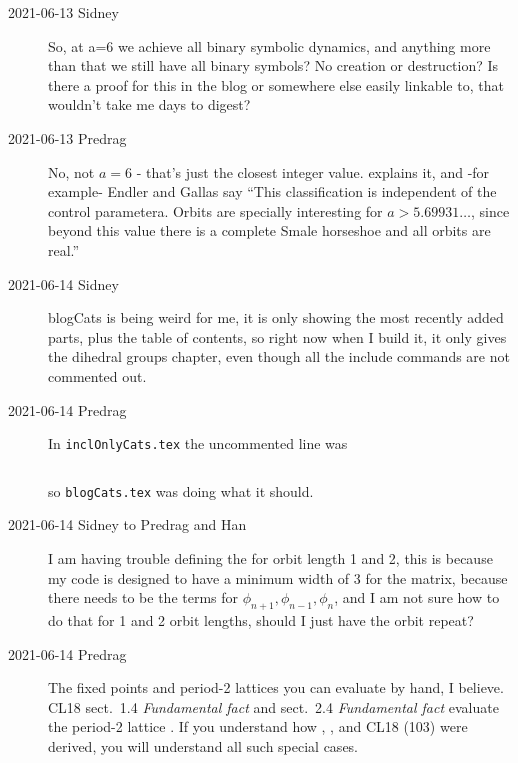 \begin{description}
\item[2021-06-13 Sidney]
So, at a=6 we achieve all binary symbolic dynamics, and anything more than
that we still have all binary symbols? No creation or destruction? Is there a
proof for this in the blog or somewhere else easily linkable to, that
wouldn't take me days to digest?

\item[2021-06-13 Predrag]
No, not $a=6$ - that's just the closest integer value.
 explains it,
and -for example- Endler and Gallas say ``This classification is
independent of the control parametera. Orbits   are   specially   interesting
for $a>5.69931\dots$, since beyond this value there is a complete Smale
horseshoe and all orbits are real.''


\item[2021-06-14 Sidney]
blogCats is being weird for me, it is only showing the most recently added
parts, plus the table of contents, so right now when I build it, it only
gives the dihedral groups chapter, even though all the include commands are
not commented out.

\item[2021-06-14 Predrag]
In \texttt{inclOnlyCats.tex} the uncommented line was
\begin{verbatim}

\end{verbatim}
so \texttt{blogCats.tex} was doing what it should.

\item[2021-06-14 Sidney to Predrag and Han]
I am having trouble defining the {\jacobianOrb}  for orbit length 1 and 2,
this is because my code is designed to have a minimum width of 3 for the
matrix, because there needs to be the terms for
$\phi_{n+1},\phi_{n-1},\phi_{n}$, and I am not sure how to do that for 1 and
2 orbit lengths, should I just have the orbit repeat?

\item[2021-06-14 Predrag]
The fixed points and period-2 lattices you can evaluate by hand, I believe.
CL18 
{sect.~1.4} {\em  Fundamental fact} and
{sect.~2.4} {\em  Fundamental fact}
evaluate the period-2 lattice {\jacobianOrbs}. If you understand how
,
, and
CL18 
{(103)} were derived, you will understand all such special cases.


\end{description}
